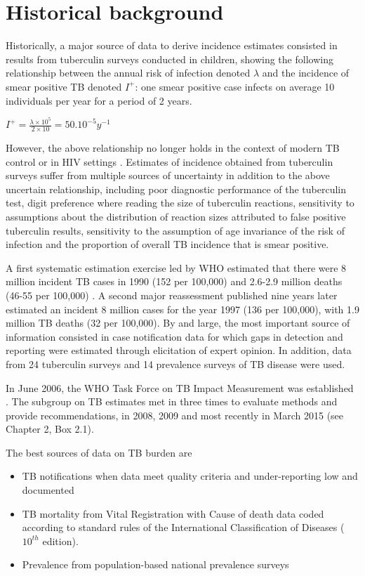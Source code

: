 \section{Historical background}

Historically, a major source of data to derive incidence estimates consisted in results from tuberculin surveys conducted in children\cite{Styblo1985}, showing the following relationship between the annual risk of infection denoted $\lambda$ and the incidence of smear positive TB denoted $I^+$: one smear positive case infects on average 10 individuals per year for a period of 2 years.

$I^+ = \frac{\lambda \times 10^5}{2 \times 10} = 50.10^{-5} y^{-1}$

However, the above relationship no longer holds in the context of modern TB control or in HIV settings \cite{18235886}. Estimates of incidence obtained from tuberculin surveys suffer from multiple sources of uncertainty in addition to the above uncertain relationship, including poor diagnostic performance of the tuberculin test, digit preference where reading the size of tuberculin reactions, sensitivity to assumptions about the distribution of reaction sizes attributed to false positive tuberculin results, sensitivity to the assumption of age invariance of the risk of infection and the proportion of overall TB incidence that is smear positive. 

A first systematic estimation exercise led by WHO estimated that there were 8 million incident TB cases in 1990 (152 per 100,000) and 2.6-2.9 million deaths (46-55 per 100,000) \cite{1600578}. A second major reassessment published nine years later \cite{10517722} estimated an incident 8 million cases for the year 1997 (136 per 100,000), with 1.9 million TB deaths (32 per 100,000). By and large, the most important source of information consisted in case notification data for which gaps in detection and reporting were estimated through elicitation of expert opinion. In addition, data from 24 tuberculin surveys and 14 prevalence surveys of TB disease were used.

In June 2006, the WHO Task Force on TB Impact Measurement was established \cite{18201929}. The subgroup on TB estimates met in three times to evaluate methods and provide recommendations, in 2008, 2009 and most recently in March 2015 (see Chapter 2, Box 2.1).

The best sources of data on TB burden are 
\begin{itemize}
\item TB notifications when data meet quality criteria and under-reporting low and documented
\item TB mortality from Vital Registration with Cause of death data coded according to standard rules of the International Classification of Diseases ($10^{th}$ edition).
\item Prevalence from population-based national prevalence surveys
\end{itemize}




  
  
  
  
  
  
  
  
  
  
  